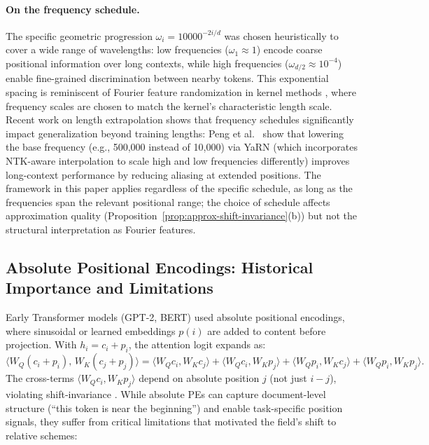 \documentclass[11pt]{article}
\theoremstyle{definition}
\begin{document}
\paragraph{On the frequency schedule.} The specific geometric progression $\omega_i = 10000^{-2i/d}$ was chosen heuristically to cover a wide range of wavelengths: low frequencies ($\omega_1 \approx 1$) encode coarse positional information over long contexts, while high frequencies ($\omega_{d/2} \approx 10^{-4}$) enable fine-grained discrimination between nearby tokens. This exponential spacing is reminiscent of Fourier feature randomization in kernel methods \cite{rahimi2007random}, where frequency scales are chosen to match the kernel's characteristic length scale. Recent work on length extrapolation shows that frequency schedules significantly impact generalization beyond training lengths: Peng et al.\ \cite{peng2024yarn} show that lowering the base frequency (e.g., 500,000 instead of 10,000) via YaRN (which incorporates NTK-aware interpolation to scale high and low frequencies differently) improves long-context performance by reducing aliasing at extended positions. The framework in this paper applies regardless of the specific schedule, as long as the frequencies span the relevant positional range; the choice of schedule affects approximation quality (Proposition~\ref{prop:approx-shift-invariance}(b)) but not the structural interpretation as Fourier features.

\subsection{Absolute Positional Encodings: Historical Importance and Limitations}

Early Transformer models (GPT-2, BERT) used absolute positional encodings, where sinusoidal or learned embeddings $p(i)$ are added to content before projection. With $h_i = c_i + p_i$, the attention logit expands as:
\[
\langle W_Q(c_i + p_i),\, W_K(c_j + p_j) \rangle = \langle W_Q c_i, W_K c_j \rangle + \langle W_Q c_i, W_K p_j \rangle + \langle W_Q p_i, W_K c_j \rangle + \langle W_Q p_i, W_K p_j \rangle.
\]
The cross-terms $\langle W_Q c_i, W_K p_j \rangle$ depend on absolute position $j$ (not just $i-j$), violating shift-invariance \cite{ke2021rethinking}. While absolute PEs can capture document-level structure (``this token is near the beginning'') and enable task-specific position signals, they suffer from critical limitations that motivated the field's shift to relative schemes:
\end{document}
